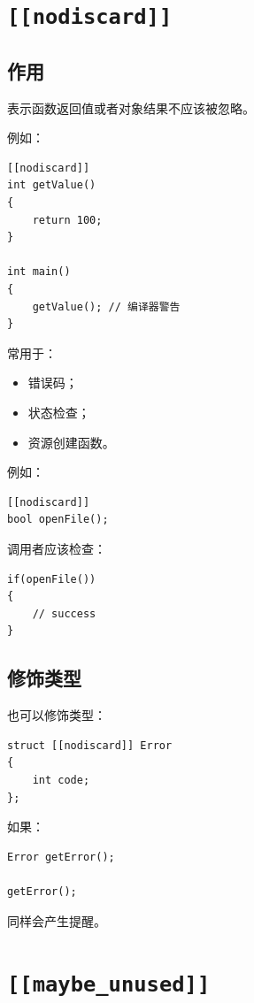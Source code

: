 \documentclass[UTF8,12pt,a4paper]{ctexart}
\begin{document}
\section{\texttt{[[nodiscard]]}}

\subsection{作用}

表示函数返回值或者对象结果不应该被忽略。

例如：

\begin{lstlisting}
[[nodiscard]]
int getValue()
{
    return 100;
}

int main()
{
    getValue(); // 编译器警告
}
\end{lstlisting}

常用于：

\begin{itemize}
\item 错误码；
\item 状态检查；
\item 资源创建函数。
\end{itemize}

例如：

\begin{lstlisting}
[[nodiscard]]
bool openFile();
\end{lstlisting}

调用者应该检查：

\begin{lstlisting}
if(openFile())
{
    // success
}
\end{lstlisting}

\subsection{修饰类型}

也可以修饰类型：

\begin{lstlisting}
struct [[nodiscard]] Error
{
    int code;
};
\end{lstlisting}

如果：

\begin{lstlisting}
Error getError();

getError();
\end{lstlisting}

同样会产生提醒。

\section{\texttt{[[maybe\_unused]]}}
\end{document}

